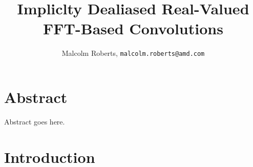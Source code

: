 \documentclass[twocolumn,10pt,notitlepage]{article}
\title{Impliclty Dealiased Real-Valued FFT-Based Convolutions}
\date{}
\author{Malcolm Roberts, \texttt{malcolm.roberts@amd.com}}
\begin{document}
\maketitle
\thispagestyle{fancy}

\section*{Abstract}

Abstract goes here.


\section{Introduction}





\end{document}
